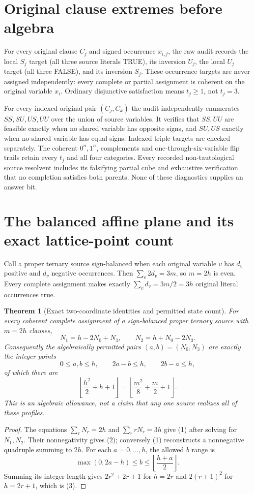 \documentclass[10pt]{article}
\newtheorem{theorem}{Theorem}
\begin{document}
\section{Original clause extremes before algebra}
For every original clause $C_j$ and signed occurrence $x_{i,j}$, the raw
audit records the local $S_j$ target (all three source literals TRUE), its
inversion $U_j$, the local $U_j$ target (all three FALSE), and its inversion
$S_j$.  These occurrence targets are never assigned independently: every
complete or partial assignment is coherent on the original variable $x_i$.
Ordinary disjunctive satisfaction means $t_j\ge1$, not $t_j=3$.

For every indexed original pair $(C_j,C_k)$ the audit independently
enumerates $SS,SU,US,UU$ over the union of source variables.  It verifies
that $SS,UU$ are feasible exactly when no shared variable has opposite signs,
and $SU,US$ exactly when no shared variable has equal signs.  Indexed triple
targets are checked separately.  The coherent $0^n,1^n$, complements and
one-through-six-variable flip trails retain every $t_j$ and all four
categories.  Every recorded non-tautological source resolvent includes its
falsifying partial cube and exhaustive verification that no completion
satisfies both parents.  None of these diagnostics supplies an answer bit.

\section{The balanced affine plane and its exact lattice-point count}
Call a proper ternary source sign-balanced when each original variable $v$
has $d_v$ positive and $d_v$ negative occurrences.  Then
$\sum_v2d_v=3m$, so $m=2h$ is even.  Every complete assignment makes exactly
$\sum_vd_v=3m/2=3h$ original literal occurrences true.

\begin{theorem}[Exact two-coordinate identities and permitted state count]
For every coherent complete assignment of a sign-balanced proper ternary
source with $m=2h$ clauses,
\[
N_1=h-2N_0+N_3,\qquad N_2=h+N_0-2N_3.                 \tag{1}
\]
Consequently the algebraically permitted pairs $(a,b)=(N_0,N_3)$ are exactly
the integer points
\[
0\le a,b\le h,\qquad 2a-b\le h,\qquad 2b-a\le h,       \tag{2}
\]
of which there are
\[
\boxed{\left\lfloor\frac{h^2}{2}+h+1\right\rfloor}
=\left\lfloor\frac{m^2}{8}+\frac m2+1\right\rfloor.   \tag{3}
\]
This is an algebraic allowance, not a claim that any one source realizes all
of these profiles.
\end{theorem}
\begin{proof}
The equations $\sum_rN_r=2h$ and $\sum_rrN_r=3h$ give (1) after solving for
$N_1,N_2$.  Their nonnegativity gives (2); conversely (1) reconstructs a
nonnegative quadruple summing to $2h$.  For each $a=0,\ldots,h$, the allowed
$b$ range is
\[
\max(0,2a-h)\le b\le\left\lfloor\frac{h+a}{2}\right\rfloor.
\]
Summing its integer length gives $2r^2+2r+1$ for $h=2r$ and
$2(r+1)^2$ for $h=2r+1$, which is (3).
\end{proof}
\end{document}
